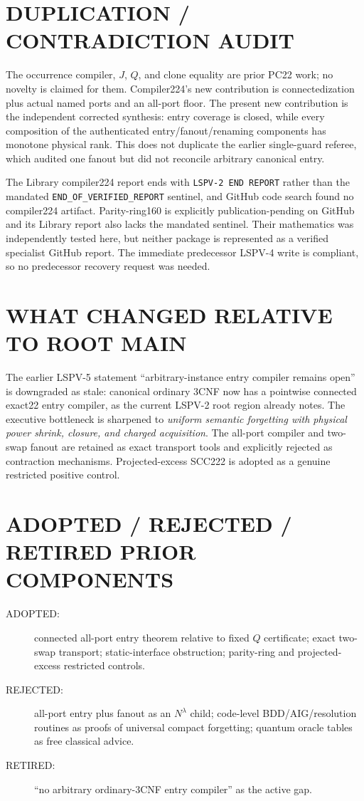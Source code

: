 \documentclass[11pt]{article}
\begin{document}
\section{DUPLICATION / CONTRADICTION AUDIT}
The occurrence compiler, $J$, $Q$, and clone equality are prior PC22 work; no novelty is claimed for them.  Compiler224's new contribution is connectedization plus actual named ports and an all-port floor.  The present new contribution is the independent corrected synthesis: entry coverage is closed, while every composition of the authenticated entry/fanout/renaming components has monotone physical rank.  This does not duplicate the earlier single-guard referee, which audited one fanout but did not reconcile arbitrary canonical entry.

The Library compiler224 report ends with \texttt{LSPV-2 END REPORT} rather than the mandated \texttt{END\_OF\_VERIFIED\_REPORT} sentinel, and GitHub code search found no compiler224 artifact.  Parity-ring160 is explicitly publication-pending on GitHub and its Library report also lacks the mandated sentinel.  Their mathematics was independently tested here, but neither package is represented as a verified specialist GitHub report.  The immediate predecessor LSPV-4 write is compliant, so no predecessor recovery request was needed.

\section{WHAT CHANGED RELATIVE TO ROOT MAIN}
The earlier LSPV-5 statement ``arbitrary-instance entry compiler remains open'' is downgraded as stale: canonical ordinary 3CNF now has a pointwise connected exact22 entry compiler, as the current LSPV-2 root region already notes.  The executive bottleneck is sharpened to \emph{uniform semantic forgetting with physical power shrink, closure, and charged acquisition}.  The all-port compiler and two-swap fanout are retained as exact transport tools and explicitly rejected as contraction mechanisms.  Projected-excess SCC222 is adopted as a genuine restricted positive control.

\section{ADOPTED / REJECTED / RETIRED PRIOR COMPONENTS}
\begin{description}
\item[ADOPTED:] connected all-port entry theorem relative to fixed $Q$ certificate; exact two-swap transport; static-interface obstruction; parity-ring and projected-excess restricted controls.
\item[REJECTED:] all-port entry plus fanout as an $N^\lambda$ child; code-level BDD/AIG/resolution routines as proofs of universal compact forgetting; quantum oracle tables as free classical advice.
\item[RETIRED:] ``no arbitrary ordinary-3CNF entry compiler'' as the active gap.
\end{description}
\end{document}

